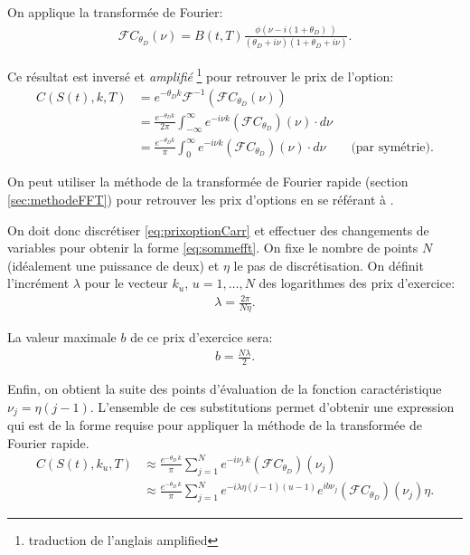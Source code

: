 On applique la transformée de Fourier:
\begin{align}
  \label{eq:fouriercallamortiCarr}
  \mathcal{F}C_{\theta_D}(\nu) = B(t,T) \frac{\phi\left( \nu - i(1+\theta_D) \ \right)}{(\theta_D+i\nu)(1+\theta_D+i\nu)}.
\end{align}

Ce résultat est inversé et \emph{amplifié} \footnote{traduction de
  l'anglais amplified} pour retrouver le prix de l'option:
\begin{align}
  C(S(t),k,T) &= e^{-\theta_{D}k} \mathcal{F}^{-1}\left(\mathcal{F}C_{\theta_D}(\nu) \right) \nonumber\\
  &= \frac{e^{-\theta_{D}k}}{2\pi} \int_{-\infty}^{\infty} e^{-i\nu k}
  (\mathcal{F}C_{\theta_D})(\nu)\cdot
  d\nu \nonumber\\
  &= \frac{e^{-\theta_{D}k}}{\pi} \int_{0}^{\infty} e^{-i\nu k}
  (\mathcal{F}C_{\theta_D})(\nu)\cdot d\nu \qquad \mbox{(par
    symétrie)}. \label{eq:prixoptionCarr}
\end{align}

On peut utiliser la méthode de la transformée de Fourier rapide
(section \ref{sec:methodeFFT}) pour retrouver les prix d'options en se
référant à \cite{carr1999option}.

On doit donc discrétiser \eqref{eq:prixoptionCarr} et effectuer des
changements de variables pour obtenir la forme \eqref{eq:sommefft}. On
fixe le nombre de points $N$ (idéalement une puissance de deux) et
$\eta$ le pas de discrétisation. On définit l'incrément $\lambda$ pour le
vecteur $k_u$, $u=1,\ldots,N$ des logarithmes des prix d'exercice:
\begin{align}
  \lambda = \frac{2\pi}{N\eta}.
\end{align}

La valeur maximale $b$ de ce prix d'exercice sera:
\begin{align}
  b=\frac{N\lambda}{2}.
\end{align}

Enfin, on obtient la suite des points d'évaluation de la fonction
caractéristique $\nu_j = \eta (j-1)$. L'ensemble de ces substitutions
permet d'obtenir une expression qui est de la forme requise pour
appliquer la méthode de la transformée de Fourier rapide.
\begin{align}
  C(S(t),k_u,T) &\approx \frac{e^{-\theta_D\,k}}{\pi} \sum_{j=1}^N e^{-i\nu_j\,k} (\mathcal{F}C_{\theta_D})(\nu_j) \nonumber\\
  &\approx \frac{e^{-\theta_D\,k}}{\pi} \sum_{j=1}^N
  e^{-i\lambda\eta(j-1)(u-1)} e^{ib\nu_j}
  (\mathcal{F}C_{\theta_D})(\nu_j) \eta. \label{eq:prixoptionFFT}
\end{align}

